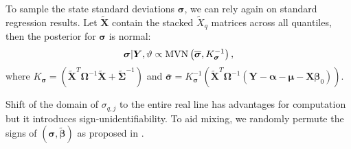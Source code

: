 %
To sample the state standard deviations $\boldsymbol{\sigma}$, we can rely again on standard regression results. Let $\boldsymbol{\tilde{X}}$ contain the stacked $\tilde{X}_q$ matrices across all quantiles, then the posterior for $\boldsymbol{\sigma}$ is normal:
%
\begin{equation}
    \boldsymbol{\sigma}|\boldsymbol{Y},\vartheta \propto \mathrm{MVN}\left(\overline{\boldsymbol{\sigma}},K_{\boldsymbol{\sigma}}^{-1}\right),
\end{equation}
%
where $K_{\boldsymbol{\sigma}} = (\boldsymbol{\tilde{X}}^{T}\boldsymbol{\Omega}^{-1}\boldsymbol{\tilde{X}} + \boldsymbol{\tilde{\Sigma}}^{-1})$ and $\overline{\boldsymbol{\sigma}} = K_{\boldsymbol{\sigma}}^{-1} (\boldsymbol{\tilde{X}}^{T}\boldsymbol{\Omega}^{-1}(\boldsymbol{Y} - \boldsymbol{\alpha} - \boldsymbol{\mu} - \boldsymbol{X}\boldsymbol{\beta}_0))$. 

Shift of the domain of $\sigma_{q,j}$ to the entire real line has advantages for computation but it introduces sign-unidentifiability. To aid mixing,  we randomly permute the signs of $(\boldsymbol{\sigma},\boldsymbol{\tilde{\beta}})$ as proposed in \citet{bitto2019achieving}.%
%